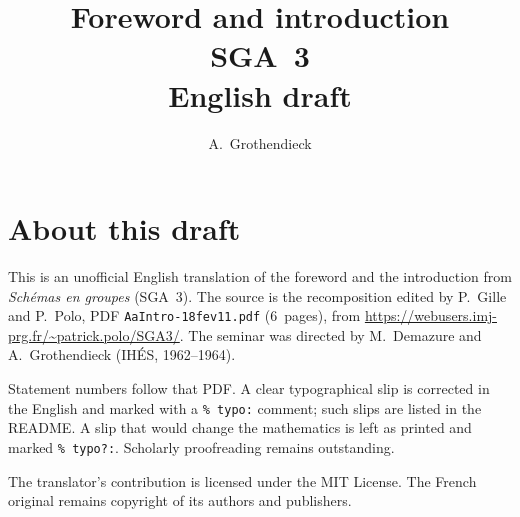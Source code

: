 \documentclass[11pt,a4paper,oneside]{amsbook}
\title[SGA~3, Introduction (English draft)]{Foreword and introduction\\
{\normalsize SGA~3\\English draft}}
\author{A.\ Grothendieck}
\date{}
\begin{document}
\frontmatter
\maketitle

\chapter*{About this draft}
This is an unofficial English translation of the foreword and the introduction
from \textit{Sch\'emas en groupes} (SGA~3).
The source is the recomposition edited by P.~Gille and P.~Polo,
PDF \texttt{AaIntro-18fev11.pdf} (6~pages),
from \url{https://webusers.imj-prg.fr/~patrick.polo/SGA3/}.
The seminar was directed by M.~Demazure and A.~Grothendieck
(IH\'ES, 1962--1964).

Statement numbers follow that PDF. A clear typographical slip is
corrected in the English and marked with a \texttt{\% typo:} comment;
such slips are listed in the README. A slip that would change the
mathematics is left as printed and marked \texttt{\% typo?:}.
Scholarly proofreading remains outstanding.

The translator's contribution is licensed under the MIT License.
The French original remains copyright of its authors and publishers.

\tableofcontents
\mainmatter

\end{document}
